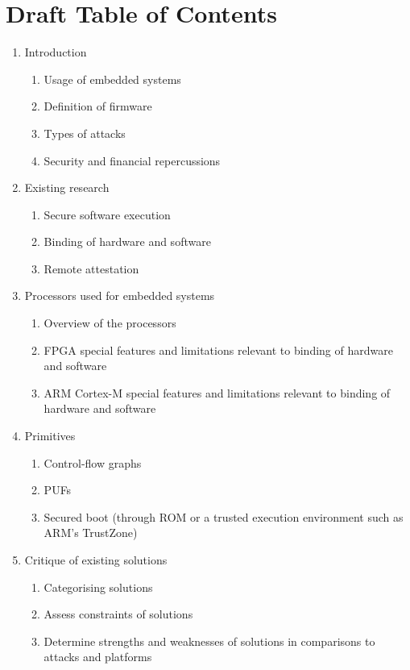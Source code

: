 \documentclass[10pt]{report}
\begin{document}
\chapter*{Draft Table of Contents}
\begin{enumerate}
	\item Introduction
		\begin{enumerate}[{1.}1]
			\item Usage of embedded systems	
			\item Definition of firmware	
			\item Types of attacks
			\item Security and financial repercussions 
		\end{enumerate}
	\item Existing research
		\begin{enumerate}[{2.}1]
			\item Secure software execution
			\item Binding of hardware and software
			\item Remote attestation
		\end{enumerate}
	\item Processors used for embedded systems
		\begin{enumerate}[{3.}1]
			\item Overview of the processors
			\item FPGA special features and limitations relevant to binding of hardware and software
			\item ARM Cortex-M special features and limitations relevant to binding of hardware and software
		\end{enumerate}
	\item Primitives
		\begin{enumerate}[{4.}1]
			\item Control-flow graphs
			\item PUFs
			\item Secured boot (through ROM or a trusted execution environment such as ARM's TrustZone)			
		\end{enumerate}
	\item Critique of existing solutions
		\begin{enumerate}[{5.}1]
			\item Categorising solutions
			\item Assess constraints of solutions
			\item Determine strengths and weaknesses of solutions in comparisons to attacks and platforms 
		\end{enumerate}

\end{enumerate}
\end{document}
